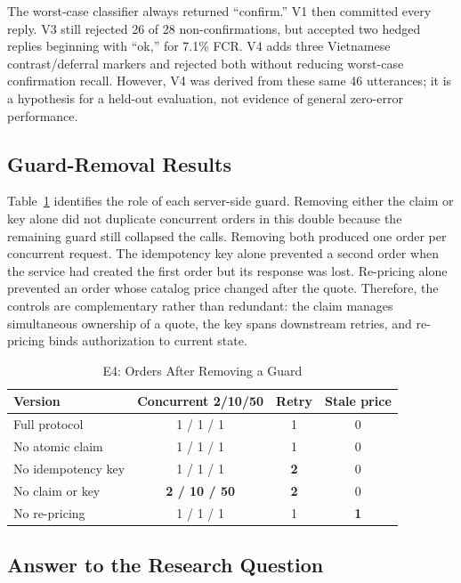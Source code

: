 \documentclass{IEEEtran}
\begin{document}
The worst-case classifier always returned ``confirm.'' V1 then committed every reply. V3 still rejected 26 of 28 non-confirmations, but accepted two hedged replies beginning with ``ok,'' for 7.1\% FCR. V4 adds three Vietnamese contrast/deferral markers and rejected both without reducing worst-case confirmation recall. However, V4 was derived from these same 46 utterances; it is a hypothesis for a held-out evaluation, not evidence of general zero-error performance.

\subsection{Guard-Removal Results}

Table~\ref{tab:ablation} identifies the role of each server-side guard. Removing either the claim or key alone did not duplicate concurrent orders in this double because the remaining guard still collapsed the calls. Removing both produced one order per concurrent request. The idempotency key alone prevented a second order when the service had created the first order but its response was lost. Re-pricing alone prevented an order whose catalog price changed after the quote. Therefore, the controls are complementary rather than redundant: the claim manages simultaneous ownership of a quote, the key spans downstream retries, and re-pricing binds authorization to current state.

\begin{table}[t]
\caption{E4: Orders After Removing a Guard}
\label{tab:ablation}
\centering
\footnotesize
\setlength{\tabcolsep}{3.5pt}
\begin{tabular}{@{}lccc@{}}
\toprule
Version & Concurrent 2/10/50 & Retry & Stale price \\
\midrule
Full protocol & 1 / 1 / 1 & 1 & 0 \\
No atomic claim & 1 / 1 / 1 & 1 & 0 \\
No idempotency key & 1 / 1 / 1 & \textbf{2} & 0 \\
No claim or key & \textbf{2 / 10 / 50} & \textbf{2} & 0 \\
No re-pricing & 1 / 1 / 1 & 1 & \textbf{1} \\
\bottomrule
\end{tabular}
\end{table}

\subsection{Answer to the Research Question}
\end{document}
